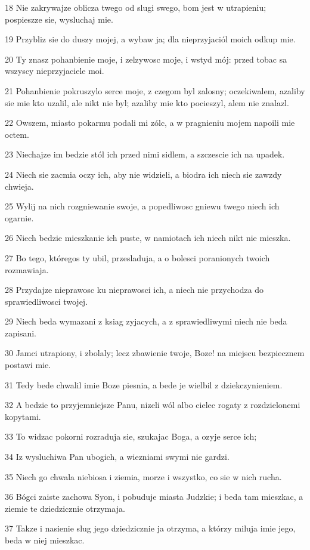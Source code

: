 \par 18 Nie zakrywajze oblicza twego od slugi swego, bom jest w utrapieniu; pospieszze sie, wysluchaj mie.
\par 19 Przybliz sie do duszy mojej, a wybaw ja; dla nieprzyjaciól moich odkup mie.
\par 20 Ty znasz pohanbienie moje, i zelzywosc moje, i wstyd mój: przed tobac sa wszyscy nieprzyjaciele moi.
\par 21 Pohanbienie pokruszylo serce moje, z czegom byl zalosny; oczekiwalem, azaliby sie mie kto uzalil, ale nikt nie byl; azaliby mie kto pocieszyl, alem nie znalazl.
\par 22 Owszem, miasto pokarmu podali mi zólc, a w pragnieniu mojem napoili mie octem.
\par 23 Niechajze im bedzie stól ich przed nimi sidlem, a szczescie ich na upadek.
\par 24 Niech sie zacmia oczy ich, aby nie widzieli, a biodra ich niech sie zawzdy chwieja.
\par 25 Wylij na nich rozgniewanie swoje, a popedliwosc gniewu twego niech ich ogarnie.
\par 26 Niech bedzie mieszkanie ich puste, w namiotach ich niech nikt nie mieszka.
\par 27 Bo tego, któregos ty ubil, przesladuja, a o bolesci poranionych twoich rozmawiaja.
\par 28 Przydajze nieprawosc ku nieprawosci ich, a niech nie przychodza do sprawiedliwosci twojej.
\par 29 Niech beda wymazani z ksiag zyjacych, a z sprawiedliwymi niech nie beda zapisani.
\par 30 Jamci utrapiony, i zbolaly; lecz zbawienie twoje, Boze! na miejscu bezpiecznem postawi mie.
\par 31 Tedy bede chwalil imie Boze piesnia, a bede je wielbil z dziekczynieniem.
\par 32 A bedzie to przyjemniejsze Panu, nizeli wól albo cielec rogaty z rozdzielonemi kopytami.
\par 33 To widzac pokorni rozraduja sie, szukajac Boga, a ozyje serce ich;
\par 34 Iz wysluchiwa Pan ubogich, a wiezniami swymi nie gardzi.
\par 35 Niech go chwala niebiosa i ziemia, morze i wszystko, co sie w nich rucha.
\par 36 Bógci zaiste zachowa Syon, i pobuduje miasta Judzkie; i beda tam mieszkac, a ziemie te dziedzicznie otrzymaja.
\par 37 Takze i nasienie slug jego dziedzicznie ja otrzyma, a którzy miluja imie jego, beda w niej mieszkac.


